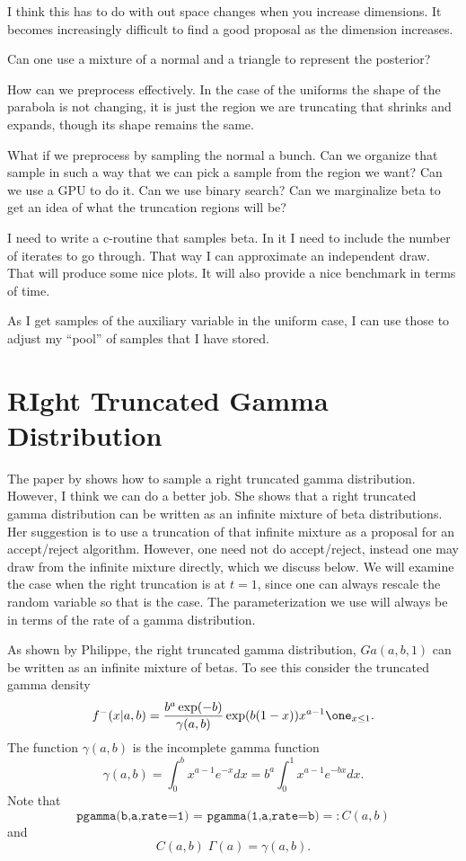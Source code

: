 \documentclass{article}
\begin{document}
I think this has to do with out space changes when you increase dimensions.  It
becomes increasingly difficult to find a good proposal as the dimension
increases.

Can one use a mixture of a normal and a triangle to represent the posterior?

How can we preprocess effectively.  In the case of the uniforms the shape of the
parabola is not changing, it is just the region we are truncating that shrinks
and expands, though its shape remains the same.

What if we preprocess by sampling the normal a bunch.  Can we organize that
sample in such a way that we can pick a sample from the region we want?  Can we
use a GPU to do it.  Can we use binary search?  Can we marginalize beta to get
an idea of what the truncation regions will be?

I need to write a c-routine that samples beta.  In it I need to include the
number of iterates to go through.  That way I can approximate an independent
draw.  That will produce some nice plots.  It will also provide a nice benchmark
in terms of time.

As I get samples of the auxiliary variable in the uniform case, I can use those
to adjust my ``pool'' of samples that I have stored.

\section{RIght Truncated Gamma Distribution}

The paper by \cite{philippe-1997} shows how to sample a right truncated gamma
distribution.  However, I think we can do a better job.  She shows that a right
truncated gamma distribution can be written as an infinite mixture of beta
distributions.  Her suggestion is to use a truncation of that infinite mixture
as a proposal for an accept/reject algorithm.  However, one need not do
accept/reject, instead one may draw from the infinite mixture directly, which we
discuss below.  We will examine the case when the right truncation is at $t=1$,
since one can always rescale the random variable so that is the case.  The
parameterization we use will always be in terms of the rate of a gamma
distribution.

As shown by Philippe, the right truncated gamma distribution, $Ga(a,b,1)$ can be
written as an infinite mixture of betas.  To see this consider the truncated
gamma density
\[
f^-(x|a,b) = \frac{b^a \exp(-b)}{\gamma(a,b)} \exp(b(1-x))x^{a-1} \one_{x\leq 1}.
\]
The function $\gamma(a,b)$ is the incomplete gamma function
\[
\gamma(a,b) = \int_0^b x^{a-1} e^{-x} dx = b^a \int_0^1 x^{a-1} e^{-bx} dx.
\]
Note that
\[
\texttt{pgamma(b,a,rate=1) = pgamma(1,a,rate=b)} =: C(a,b)
\]
and
\[
C(a,b) \; \Gamma(a) = \gamma(a,b).
\]
\end{document}
